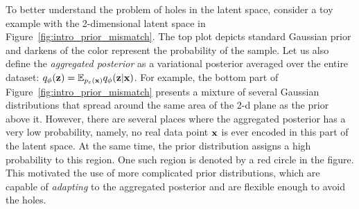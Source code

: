 To better understand the problem of holes in the latent space, consider a toy example with the 2-dimensional latent space in Figure~\ref{fig:intro_prior_mismatch}. The top plot depicts standard Gaussian prior and darkens of the color represent the probability of the sample. Let us also define the \textit{aggregated posterior} as a variational posterior averaged over the entire dataset: $q_{\phi}({\mathbf{z}}) = \mathbb{E}_{p_{e}({\mathbf{x}})}q_{\phi}({\mathbf{z}}|{\mathbf{x}})$. For example, the bottom part of Figure~\ref{fig:intro_prior_mismatch} presents a mixture of several Gaussian distributions that spread around the same area of the 2-d plane as the prior above it. However, there are several places where the aggregated posterior has a very low probability, namely, no real data point ${\mathbf{x}}$ is ever encoded in this part of the latent space. At the same time, the prior distribution assigns a high probability to this region. One such region is denoted by a red circle in the figure. 
This motivated the use of more complicated prior distributions, which are capable of \textit{adapting} to the aggregated posterior and are flexible enough to avoid the holes. 

